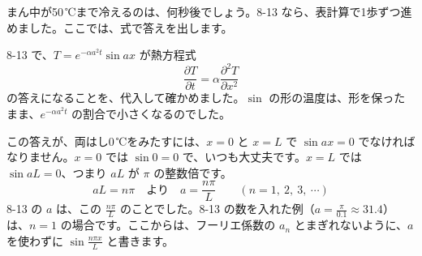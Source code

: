 まん中が50\,℃まで冷えるのは、何秒後でしょう。8-13 なら、表計算で1歩ずつ進めました。ここでは、式で答えを出します。

8-13 で、$T=e^{-\alpha a^2t}\sin ax$ が熱方程式
\[ \frac{\partial T}{\partial t}=\alpha\frac{\partial^2T}{\partial x^2} \]
の答えになることを、代入して確かめました。$\sin$ の形の温度は、形を保ったまま、$e^{-\alpha a^2t}$ の割合で小さくなるのでした。

この答えが、両はし0\,℃をみたすには、$x=0$ と $x=L$ で $\sin ax=0$ でなければなりません。$x=0$ では $\sin0=0$ で、いつも大丈夫です。$x=L$ では $\sin aL=0$、つまり $aL$ が $\pi$ の整数倍です。
\[ aL=n\pi\quad\text{より}\quad a=\frac{n\pi}{L}\qquad(n=1,\ 2,\ 3,\ \cdots) \]
8-13 の $a$ は、この $\frac{n\pi}{L}$ のことでした。8-13 の数を入れた例（$a=\frac{\pi}{0.1}\approx31.4$）は、$n=1$ の場合です。ここからは、フーリエ係数の $a_n$ とまぎれないように、$a$ を使わずに $\sin\frac{n\pi x}{L}$ と書きます。

